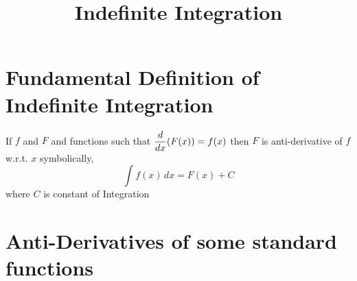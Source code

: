 \documentclass{article}
\title{Indefinite Integration}
\author{}
\date{}
\begin{document}
\maketitle

\section{Fundamental Definition of Indefinite Integration}
If $f$ and $F$ and functions such that $\displaystyle\dv{x}(F(x))=f(x)$ then $F$ is anti-derivative of $f$ w.r.t. $x$ symbolically, $$\displaystyle\int f(x) \,dx=F(x)+C$$
where $C$ is constant of Integration

\section{Anti-Derivatives of some standard functions}
\end{document}
